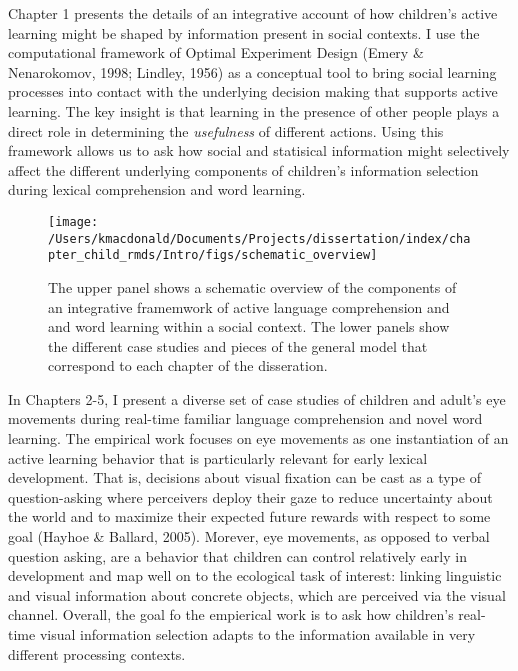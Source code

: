 \documentclass[oneside]{report}
\begin{document}
Chapter 1 presents the details of an integrative account of how
children's active learning might be shaped by information present in
social contexts. I use the computational framework of Optimal Experiment
Design (Emery \& Nenarokomov, 1998; Lindley, 1956) as a conceptual tool
to bring social learning processes into contact with the underlying
decision making that supports active learning. The key insight is that
learning in the presence of other people plays a direct role in
determining the \emph{usefulness} of different actions. Using this
framework allows us to ask how social and statisical information might
selectively affect the different underlying components of children's
information selection during lexical comprehension and word learning.
\begin{figure}[t]

{\centering \texttt{[image: /Users/kmacdonald/Documents/Projects/dissertation/index/chapter\_child\_rmds/Intro/figs/schematic\_overview]} 

}

\caption[Schematic overview of the disseration content.]{The upper panel shows a schematic overview of the components of an integrative framemwork of active language comprehension and and word learning within a social context. The lower panels show the different case studies and pieces of the general model that correspond to each chapter of the disseration.}\label{fig:schematic-overview}
\end{figure}
In Chapters 2-5, I present a diverse set of case studies of children and
adult's eye movements during real-time familiar language comprehension
and novel word learning. The empirical work focuses on eye movements as
one instantiation of an active learning behavior that is particularly
relevant for early lexical development. That is, decisions about visual
fixation can be cast as a type of question-asking where perceivers
deploy their gaze to reduce uncertainty about the world and to maximize
their expected future rewards with respect to some goal (Hayhoe \&
Ballard, 2005). Morever, eye movements, as opposed to verbal question
asking, are a behavior that children can control relatively early in
development and map well on to the ecological task of interest: linking
linguistic and visual information about concrete objects, which are
perceived via the visual channel. Overall, the goal fo the empierical
work is to ask how children's real-time visual information selection
adapts to the information available in very different processing
contexts.
\end{document}
